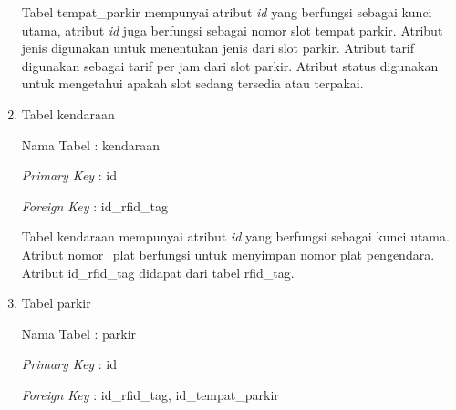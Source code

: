 \begin{enumerate}[topsep=0pt,itemsep=0pt,partopsep=0pt, parsep=0pt]
    Tabel tempat\_parkir mempunyai atribut \textit{id} yang berfungsi sebagai kunci utama, atribut \textit{id} juga berfungsi sebagai nomor slot tempat parkir. Atribut jenis digunakan untuk menentukan jenis dari slot parkir. Atribut tarif digunakan sebagai tarif per jam dari slot parkir. Atribut status digunakan untuk mengetahui apakah slot sedang tersedia atau terpakai.

    \item Tabel kendaraan

    Nama Tabel : kendaraan

    \textit{Primary Key} : id

    \textit{Foreign Key} : id\_rfid\_tag


    Tabel kendaraan mempunyai atribut \textit{id} yang berfungsi sebagai kunci utama. Atribut nomor\_plat berfungsi untuk menyimpan nomor plat pengendara. Atribut id\_rfid\_tag didapat dari tabel rfid\_tag.

    \item Tabel parkir

    Nama Tabel : parkir

    \textit{Primary Key} : id

    \textit{Foreign Key} : id\_rfid\_tag, id\_tempat\_parkir



\end{enumerate}
